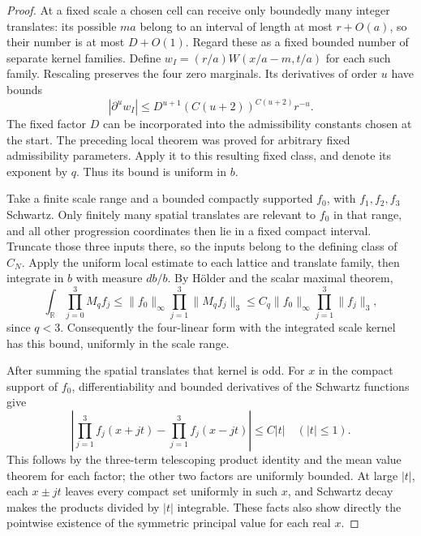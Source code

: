\documentclass[11pt]{article}
\theoremstyle{definition}
\newcommand{\R}{\mathbb R}
\numberwithin{equation}{section}
\begin{document}
\begin{proof}
At a fixed scale a chosen cell can receive only boundedly many integer translates: its possible $ma$ belong to an interval of length at most $r+O(a)$, so their number is at most $D+O(1)$. Regard these as a fixed bounded number of separate kernel families. Define $w_I=(r/a)W(x/a-m,t/a)$ for each such family. Rescaling preserves the four zero marginals. Its derivatives of order $u$ have bounds
\[
 |\partial^u w_I|\le D^{u+1}(C(u+2))^{C(u+2)}r^{-u}.
\]
The fixed factor $D$ can be incorporated into the admissibility constants chosen at the start. The preceding local theorem was proved for arbitrary fixed admissibility parameters. Apply it to this resulting fixed class, and denote its exponent by $q$. Thus its bound is uniform in $b$.

Take a finite scale range and a bounded compactly supported $f_0$, with $f_1,f_2,f_3$ Schwartz. Only finitely many spatial translates are relevant to $f_0$ in that range, and all other progression coordinates then lie in a fixed compact interval. Truncate those three inputs there, so the inputs belong to the defining class of $C_N$. Apply the uniform local estimate to each lattice and translate family, then integrate in $b$ with measure $db/b$. By H\"older and the scalar maximal theorem,
\[
 \int_\R\prod_{j=0}^3M_qf_j
 \le\|f_0\|_\infty\prod_{j=1}^3\|M_qf_j\|_3
 \le C_q\|f_0\|_\infty\prod_{j=1}^3\|f_j\|_3,
\]
since $q<3$. Consequently the four-linear form with the integrated scale kernel has this bound, uniformly in the scale range.

After summing the spatial translates that kernel is odd. For $x$ in the compact support of $f_0$, differentiability and bounded derivatives of the Schwartz functions give
\[
 \left|\prod_{j=1}^3 f_j(x+jt)-\prod_{j=1}^3 f_j(x-jt)\right|\le C|t|
 \quad(|t|\le1).
\]
This follows by the three-term telescoping product identity and the mean value theorem for each factor; the other two factors are uniformly bounded. At large $|t|$, each $x\pm jt$ leaves every compact set uniformly in such $x$, and Schwartz decay makes the products divided by $|t|$ integrable. These facts also show directly the pointwise existence of the symmetric principal value for each real $x$.


\end{proof}
\end{document}
